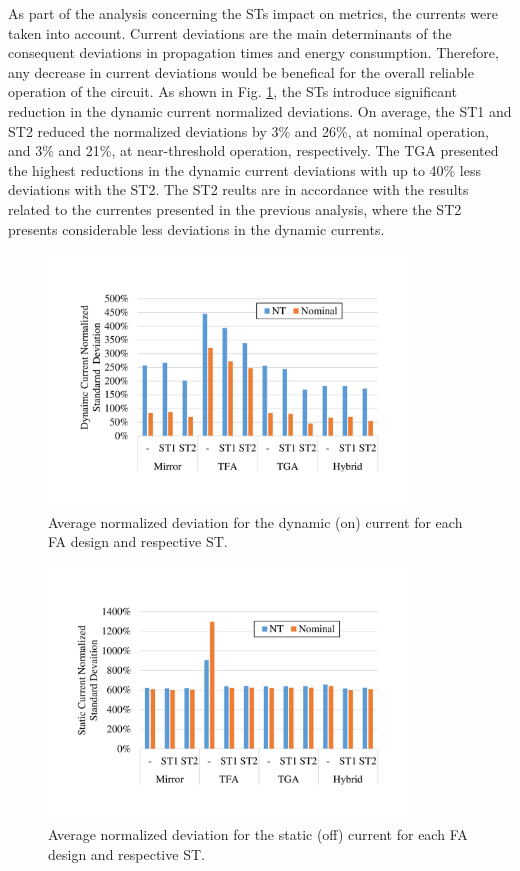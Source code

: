 \documentclass[pgmicro,diss,english]{iiufrgs}
\begin{document}
As part of the analysis concerning the STs impact on metrics, the currents were taken into account. Current deviations are the main determinants of the consequent deviations in propagation times and energy consumption. Therefore, any decrease in current deviations would be benefical for the overall reliable operation of the circuit. As shown in Fig. \ref{fig:onCurrDevFA}, the STs introduce significant reduction in the dynamic current normalized deviations. On average, the ST1 and ST2 reduced the normalized deviations by 3\% and 26\%, at nominal operation, and 3\% and 21\%, at near-threshold operation, respectively. The TGA presented the highest reductions in the dynamic current deviations with up to 40\% less deviations with the ST2. The ST2 reults are in accordance with the results related to the currentes presented in the previous analysis, where the ST2 presents considerable less deviations in the dynamic currents.

\begin{figure}[t]
  \centering
    \includegraphics[width=0.85\textwidth, trim={2cm 3cm 2cm 3cm}, clip]{onCurrDev.pdf}
     \caption{Average normalized deviation for the dynamic (on) current for each FA design and respective ST.}
  \label{fig:onCurrDevFA}
\end{figure}

\begin{figure}[h]
  \centering
    \includegraphics[width=0.85\textwidth, trim={2cm 3cm 2cm 3cm}, clip]{offCurrDev.pdf}
     \caption{Average normalized deviation for the static (off) current for each FA design and respective ST.}
  \label{fig:offCurrDevFA}
\end{figure}
\end{document}
